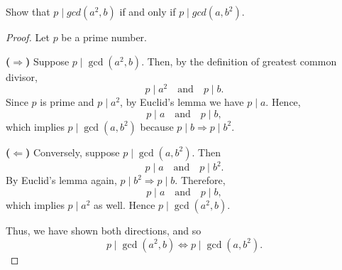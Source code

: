 \documentclass{tufte-handout}
\begin{document}
\begin{question}

Show that \( p \mid gcd(a^2, b) \) if and only if \( p \mid gcd(a, b^2) \).

\begin{proof}

Let \( p \) be a prime number.

\textbf{($\Rightarrow$)} Suppose \( p \mid \gcd(a^2, b) \).  
Then, by the definition of greatest common divisor,  
\[
p \mid a^2 \quad \text{and} \quad p \mid b.
\]
Since \( p \) is prime and \( p \mid a^2 \), by Euclid’s lemma we have \( p \mid a \).  
Hence,
\[
p \mid a \quad \text{and} \quad p \mid b,
\]
which implies \( p \mid \gcd(a, b^2) \) because \( p \mid b \Rightarrow p \mid b^2 \).

\medskip

\textbf{($\Leftarrow$)} Conversely, suppose \( p \mid \gcd(a, b^2) \).  
Then
\[
p \mid a \quad \text{and} \quad p \mid b^2.
\]
By Euclid’s lemma again, \( p \mid b^2 \Rightarrow p \mid b \).  
Therefore,
\[
p \mid a \quad \text{and} \quad p \mid b,
\]
which implies \( p \mid a^2 \) as well.  
Hence \( p \mid \gcd(a^2, b) \).

\medskip

Thus, we have shown both directions, and so
\[
p \mid \gcd(a^2, b) \iff p \mid \gcd(a, b^2).
\]

\end{proof}

\end{question}
\end{document}
